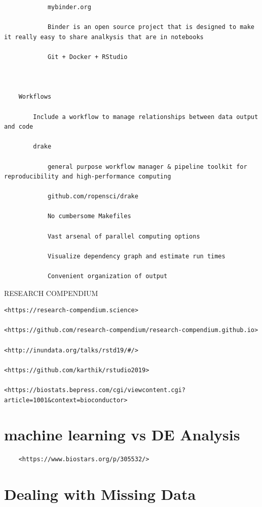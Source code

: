 \documentclass[
]{book}
\begin{document}
\begin{verbatim}
            mybinder.org

            Binder is an open source project that is designed to make it really easy to share analkysis that are in notebooks

            Git + Docker + RStudio



    Workflows

        Include a workflow to manage relationships between data output and code

        drake

            general purpose workflow manager & pipeline toolkit for reproducibility and high-performance computing

            github.com/ropensci/drake

            No cumbersome Makefiles

            Vast arsenal of parallel computing options

            Visualize dependency graph and estimate run times

            Convenient organization of output
\end{verbatim}

RESEARCH COMPENDIUM

\begin{verbatim}
<https://research-compendium.science>

<https://github.com/research-compendium/research-compendium.github.io>

<http://inundata.org/talks/rstd19/#/>

<https://github.com/karthik/rstudio2019>

<https://biostats.bepress.com/cgi/viewcontent.cgi?article=1001&context=bioconductor>
\end{verbatim}

\hypertarget{machine-learning-vs-de-analysis}{%
\section{machine learning vs DE Analysis}\label{machine-learning-vs-de-analysis}}

\begin{verbatim}
    <https://www.biostars.org/p/305532/>
\end{verbatim}

\hypertarget{dealing-with-missing-data}{%
\section{Dealing with Missing Data}\label{dealing-with-missing-data}}
\end{document}
